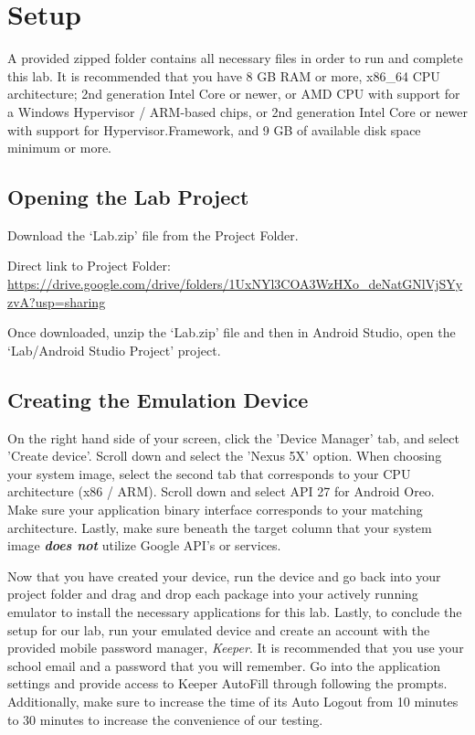 \documentclass[letterpaper,12pt]{report}
\begin{document}

\section*{Setup}\label{sec:Setup}

A provided zipped folder contains all necessary files in order to run and complete this lab. It is recommended that you have 8 GB RAM or more, x86\_64 CPU architecture; 2nd generation Intel Core or newer, or AMD CPU with support for a Windows Hypervisor / ARM-based chips, or 2nd generation Intel Core or newer with support for Hypervisor.Framework, and 9 GB of available disk space minimum or more.

\subsection*{Opening the Lab Project}\label{sec:Opening the Lab Project}

Download the `Lab.zip' file from the Project Folder.

Direct link to Project Folder: \url{https://drive.google.com/drive/folders/1UxNYl3COA3WzHXo_deNatGNlVjSYyzvA?usp=sharing}

Once downloaded, unzip the `Lab.zip' file and then in Android Studio, open the `Lab/Android Studio Project' project.

\subsection*{Creating the Emulation Device}\label{sec:Creating the Emulation Device}

On the right hand side of your screen, click the 'Device Manager' tab, and select 'Create device'. Scroll down and select the 'Nexus 5X' option. When choosing your system image, select the second tab that corresponds to your CPU architecture (x86 / ARM). Scroll down and select API 27 for Android Oreo. Make sure your application binary interface corresponds to your matching architecture. Lastly, make sure beneath the target column that your system image \textbf{\textit{does not}} utilize Google API's or services.

\bigskip

Now that you have created your device, run the device and go back into your project folder and drag and drop each package into your actively running emulator to install the necessary applications for this lab. Lastly, to conclude the setup for our lab, run your emulated device and create an account with the provided mobile password manager, \textit{Keeper}. It is recommended that you use your school email and a password that you will remember. Go into the application settings and provide access to Keeper AutoFill through following the prompts. Additionally, make sure to increase the time of its Auto Logout from 10 minutes to 30 minutes to increase the convenience of our testing.
\end{document}
